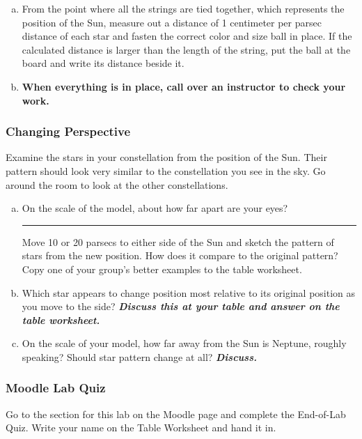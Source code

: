 \documentclass[main.tex]{subfiles}
\begin{document}
\begin{enumerate} [a.]
(ii) Luminosity class: I-large; II or III-medium; IV or V-small
\newline
\newline 
If your star has an unusual classification try googling it for more information and choose the closest representation for it that you can. Write down the color and size of the ball you decide best represents your star on the table worksheet.
    \item From the point where all the strings are tied together, which represents the position of the Sun, measure out a distance of 1 centimeter per parsec distance of each star and fasten the correct color and size ball in place. If the calculated distance is larger than the length of the string, put the ball at the board and write its distance beside it.
    \item \textbf{When everything is in place, call over an instructor to check your work.}
\end{enumerate}

\subsubsection{Changing Perspective}
Examine the stars in your constellation from the position of the Sun. Their pattern should look very similar to the constellation you see in the sky. Go around the room to look at the other constellations. 
\begin{enumerate} [a.]
    \item On the scale of the model, about how far apart are your eyes?\rule{2cm}{.15mm} 
    \newline 
Move 10 or 20 parsecs to either side of the Sun and sketch the pattern of stars from the new position. How does it compare to the original pattern?
\newline
Copy one of your group's better examples to the table worksheet.
\item Which star appears to change position most relative to its original position as you move to the side? \textbf{\textit{Discuss this at your table and answer on the table worksheet.}}
\item On the scale of your model, how far away from the Sun is Neptune, roughly speaking? Should star pattern change at all? \textbf{\textit{Discuss.}}
\end{enumerate}

\subsubsection{Moodle Lab Quiz}
Go to the section for this lab on the Moodle page and complete the End-of-Lab Quiz. Write your name on the Table Worksheet and hand it in.
\end{document}
